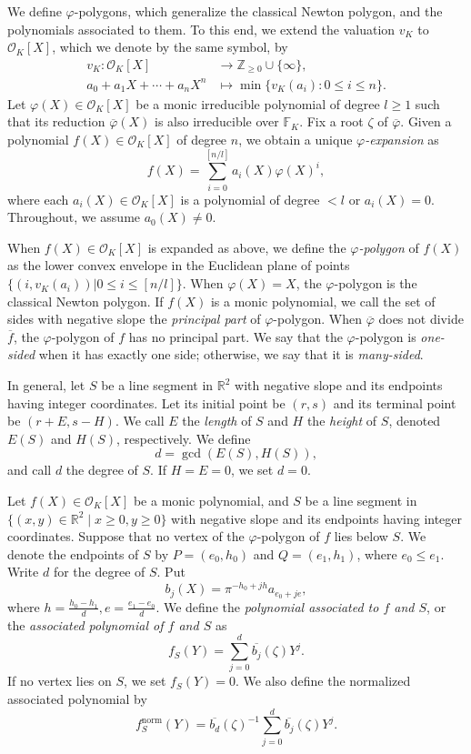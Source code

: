 \documentclass{article}
\newcommand{\field}[1]{\mathbb{#1}}
\newcommand{\Z}{\field{Z}}
\newcommand{\R}{\field{R}}
\theoremstyle{definition}
\theoremstyle{remark}
\numberwithin{equation}{section}
\begin{document}
    We define $\varphi$-polygons, which generalize the classical Newton polygon, and the polynomials associated to them. 
    To this end, we extend the valuation $v_K$ to $\mathcal{O}_K[X]$, which we denote by the same symbol, by 
    \begin{align}
      v_K:\mathcal{O}_K[X] & \rightarrow \Z_{\ge 0} \cup \{ \infty \}, \\
      a_0 + a_1 X + \cdots + a_n X^n & \mapsto \min\{v_K(a_i):0 \le i \le n \}. 
    \end{align}
    Let $\varphi(X) \in \mathcal{O}_K[X]$ be a monic irreducible polynomial of degree $l \ge 1$ such that 
    its reduction $\overline{\varphi}(X)$ is also irreducible over $\field{F}_K$. 
    Fix a root $\zeta$ of $\overline{\varphi}$. 
    Given a polynomial $f(X) \in \mathcal{O}_K[X]$ of degree $n$, we obtain a unique \emph{$\varphi$-expansion} as 
    \[
      f(X) = \sum_{i = 0}^{[n/l]} a_i(X) \varphi(X)^i, 
    \]
    where each $a_i(X) \in \mathcal{O}_K[X]$ is a polynomial of degree $< l$ or $a_i(X)=0$. 
    Throughout, we assume $a_0(X) \ne 0$. 

    When $f(X) \in \mathcal{O}_K[X]$ is expanded as above, we define the \emph{$\varphi$-polygon} of $f(X)$ 
    as the lower convex envelope in the Euclidean plane of points $\{(i,v_K(a_i))|0 \le i \le [n/l]\}$. 
    When $\varphi(X) = X$, the $\varphi$-polygon is the classical Newton polygon. 
    If $f(X)$ is a monic polynomial, we call the set of sides with negative slope the \emph{principal part} of $\varphi$-polygon. 
    When $\overline{\varphi}$ does not divide $\overline{f}$, the $\varphi$-polygon of $f$ has no principal part. 
    We say that the $\varphi$-polygon is \emph{one-sided} when it has exactly one side; otherwise, we say that it is \emph{many-sided}. 

    In general, let $S$  be a line segment in $\R^2$ with negative slope and its endpoints
    having integer coordinates. 
    Let its initial point be $(r,s)$ and its terminal point be $(r + E,s - H)$. 
    We call $E$ the \emph{length} of $S$ and $H$ the \emph{height} of $S$, denoted $E(S)$ and $H(S)$, respectively. 
    We define 
    \[
      d = \gcd(E(S),H(S)), 
    \]
    and call $d$ the degree of $S$. If $H = E = 0$, we set $d = 0$. 

    Let $f(X) \in \mathcal{O}_K[X]$ be a monic polynomial, and $S$ be a line segment 
    in $\{ (x,y) \in \R^2 \mid x \ge 0, y \ge 0 \}$ with negative slope and its endpoints having integer coordinates. 
    Suppose that no vertex of the $\varphi$-polygon of $f$ lies below $S$. 
    We denote the endpoints of $S$ by $P = (e_0,h_0)$ and $Q = (e_1,h_1)$, where $e_0 \le e_1$. 
    Write $d$ for the degree of $S$. 
    Put 
    \[
      b_j(X) = \pi^{-h_0 + jh} a_{e_0 + je}, 
    \]
    where $h = \frac{h_0 - h_1}{d}, e = \frac{e_1 - e_0}{d}$. 
    We define the \emph{polynomial associated to $f$ and $S$}, or the \emph{associated polynomial of $f$ and $S$} 
    as 
    \[
      f_S(Y) = \sum_{j=0}^d \overline{b_j}(\zeta) Y^j.
    \]
    If no vertex lies on $S$, we set $f_S(Y) = 0$. 
    We also define the normalized associated polynomial by 
    \[
      f_S^{\mathrm{norm}}(Y) = \overline{b_d}(\zeta)^{-1} \sum_{j=0}^d \overline{b_j}(\zeta) Y^j.
    \]
\end{document}
